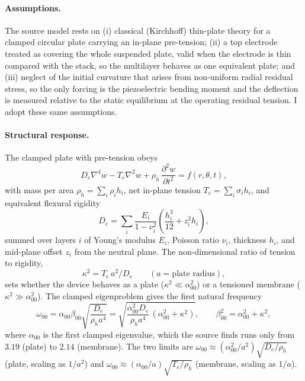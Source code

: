 \documentclass{article}
\begin{document}
\paragraph{Assumptions.} The source model rests on (i) classical (Kirchhoff) thin-plate theory
for a clamped circular plate carrying an in-plane pre-tension; (ii) a top electrode treated as
covering the whole suspended plate, valid when the electrode is thin compared with the stack, so
the multilayer behaves as one equivalent plate; and (iii) neglect of the initial curvature that
arises from non-uniform radial residual stress, so the only forcing is the piezoelectric bending
moment and the deflection is measured relative to the static equilibrium at the operating
residual tension. I adopt these same assumptions.

\paragraph{Structural response.} The clamped plate with pre-tension obeys
\begin{equation}
D_e \nabla^4 w - T_e \nabla^2 w + \rho_h\,\frac{\partial^2 w}{\partial t^2} = f(r,\theta,t),
\label{eq:eom}
\end{equation}
with mass per area $\rho_h=\sum_i \rho_i h_i$, net in-plane tension $T_e=\sum_i \sigma_i h_i$, and
equivalent flexural rigidity
\begin{equation}
D_e = \sum_i \frac{E_i}{1-\nu_i^2}\left(\frac{h_i^3}{12} + z_i^2 h_i\right),
\label{eq:De}
\end{equation}
summed over layers $i$ of Young's modulus $E_i$, Poisson ratio $\nu_i$, thickness $h_i$, and
mid-plane offset $z_i$ from the neutral plane. The non-dimensional ratio of tension to rigidity,
\begin{equation}
\kappa^2 = T_e\,a^2 / D_e \qquad (a=\text{plate radius}),
\label{eq:kappa}
\end{equation}
sets whether the device behaves as a plate ($\kappa^2 \ll \alpha_{00}^2$) or a tensioned membrane
($\kappa^2 \gg \alpha_{00}^2$). The clamped eigenproblem gives the first natural frequency
\begin{equation}
\omega_{00} = \alpha_{00}\beta_{00}\sqrt{\frac{D_e}{\rho_h a^4}}
            = \sqrt{\frac{\alpha_{00}^2 D_e}{\rho_h a^4}\,(\alpha_{00}^2+\kappa^2)},
\qquad \beta_{00}^2=\alpha_{00}^2+\kappa^2,
\label{eq:wn}
\end{equation}
where $\alpha_{00}$ is the first clamped eigenvalue, which the source finds runs only from $3.19$
(plate) to $2.14$ (membrane). The two limits are
$\omega_{00}\approx(\alpha_{00}^2/a^2)\sqrt{D_e/\rho_h}$ (plate, scaling as $1/a^2$) and
$\omega_{00}\approx(\alpha_{00}/a)\sqrt{T_e/\rho_h}$ (membrane, scaling as $1/a$).
\end{document}
